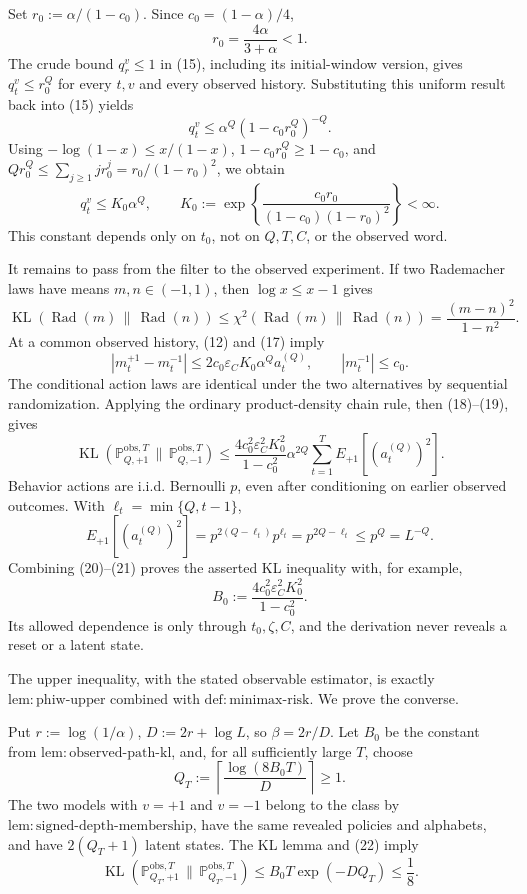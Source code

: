 Set \(r_0:=\alpha/(1-c_0)\).  Since \(c_0=(1-\alpha)/4\),
\[
 r_0=\frac{4\alpha}{3+\alpha}<1. \tag{16}
\]
The crude bound \(q_r^v\le1\) in (15), including its initial-window version, gives \(q_t^v\le r_0^Q\) for every \(t,v\) and every observed history.  Substituting this uniform result back into (15) yields
\[
 q_t^v\le\alpha^Q(1-c_0r_0^Q)^{-Q}.
\]
Using \(-\log(1-x)\le x/(1-x)\), \(1-c_0r_0^Q\ge1-c_0\), and
\(Qr_0^Q\le\sum_{j\ge1}jr_0^j=r_0/(1-r_0)^2\), we obtain
\[
 q_t^v\le K_0\alpha^Q,
 \qquad
 K_0:=\exp\!\left\{\frac{c_0r_0}{(1-c_0)(1-r_0)^2}\right\}<\infty. \tag{17}
\]
This constant depends only on \(t_0\), not on \(Q,T,C\), or the observed word.

It remains to pass from the filter to the observed experiment.  If two Rademacher laws have means \(m,n\in(-1,1)\), then \(\log x\le x-1\) gives
\[
 \operatorname{KL}(\operatorname{Rad}(m)\,\|\,\operatorname{Rad}(n))
 \le\chi^2(\operatorname{Rad}(m)\,\|\,\operatorname{Rad}(n))
 =\frac{(m-n)^2}{1-n^2}. \tag{18}
\]
At a common observed history, (12) and (17) imply
\[
 |m_t^{+1}-m_t^{-1}|
 \le2c_0\varepsilon_CK_0\alpha^Qa_t^{(Q)},
 \qquad |m_t^{-1}|\le c_0. \tag{19}
\]
The conditional action laws are identical under the two alternatives by sequential randomization.  Applying the ordinary product-density chain rule, then (18)--(19), gives
\[
 \operatorname{KL}(\mathbb P_{Q,+1}^{\mathrm{obs},T}\,\|\,
                    \mathbb P_{Q,-1}^{\mathrm{obs},T})
 \le \frac{4c_0^2\varepsilon_C^2K_0^2}{1-c_0^2}
       \alpha^{2Q}\sum_{t=1}^TE_{+1}[(a_t^{(Q)})^2]. \tag{20}
\]
Behavior actions are i.i.d. Bernoulli \(p\), even after conditioning on earlier observed outcomes.  With \(\ell_t=\min\{Q,t-1\}\),
\[
 E_{+1}[(a_t^{(Q)})^2]
 =p^{2(Q-\ell_t)}p^{\ell_t}=p^{2Q-\ell_t}\le p^Q=L^{-Q}. \tag{21}
\]
Combining (20)--(21) proves the asserted KL inequality with, for example,
\[
 B_0:=\frac{4c_0^2\varepsilon_C^2K_0^2}{1-c_0^2}.
\]
Its allowed dependence is only through \(t_0,\zeta,C\), and the derivation never reveals a reset or a latent state.

The upper inequality, with the stated observable estimator, is exactly \(\mathrm{lem{:}phiw\text{-}upper}\) combined with \(\mathrm{def{:}minimax\text{-}risk}\).  We prove the converse.

Put \(r:=\log(1/\alpha)\), \(D:=2r+\log L\), so \(\beta=2r/D\).  Let \(B_0\) be the constant from \(\mathrm{lem{:}observed\text{-}path\text{-}kl}\), and, for all sufficiently large \(T\), choose
\[
 Q_T:=\left\lceil\frac{\log(8B_0T)}{D}\right\rceil\ge1. \tag{22}
\]
The two models with \(v=+1\) and \(v=-1\) belong to the class by \(\mathrm{lem{:}signed\text{-}depth\text{-}membership}\), have the same revealed policies and alphabets, and have \(2(Q_T+1)\) latent states.  The KL lemma and (22) imply
\[
 \operatorname{KL}(\mathbb P_{Q_T,+1}^{\mathrm{obs},T}\,\|\,
                    \mathbb P_{Q_T,-1}^{\mathrm{obs},T})
 \le B_0T\exp(-DQ_T)\le\frac18. \tag{23}
\]

